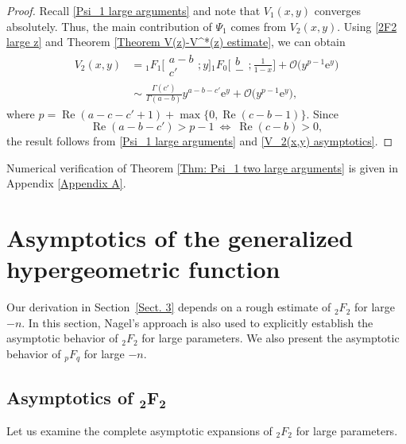\documentclass[pdftex]{sigma}
\numberwithin{equation}{section}
\newcommand{\me}{\mathrm{e}}
\newcommand{\mo}{\mathcal{O}}
\begin{document}
\begin{proof}
	Recall \eqref{Psi_1 large arguments} and note that $V_1(x,y)$ converges absolutely. Thus, the main contribution of $\Psi_1$ comes from $V_2(x,y)$. Using \eqref{2F2 large z} and Theorem \ref{Theorem V(z)-V^*(z) estimate}, we can obtain
	\begin{align}
		V_2(x,y)&{} ={}_1F_1\biggl[\begin{matrix}
			a-b\\
			c'
		\end{matrix};y\biggr]{}_1F_0\biggl[\begin{matrix}
			b\\
			-
		\end{matrix};\frac{1}{1-x}\biggr]+\mo\bigl(y^{p-1}\me^y\bigr)\nonumber\\
		&{} \sim \frac{\Gamma(c')}{\Gamma(a-b)}y^{a-b-c'}\me^y+\mo\bigl(y^{p-1}\me^y\bigr), \label{V_2(x,y) asymptotics}
	\end{align}
	where $p=\operatorname{Re}(a-c-c'+1)+\max\{0,\operatorname{Re}(c-b-1)\}$. Since
	\[\operatorname{Re}(a-b-c')>p-1 \ \Leftrightarrow \ \operatorname{Re}(c-b)>0,\]
	the result follows from \eqref{Psi_1 large arguments} and \eqref{V_2(x,y) asymptotics}.
\end{proof}

Numerical verification of Theorem \ref{Thm: Psi_1 two large arguments} is given in Appendix \ref{Appendix A}.


\section{Asymptotics of the generalized hypergeometric function}\label{Sect. 4}
Our derivation in Section~\ref{Sect. 3} depends on a rough estimate of $_2F_2$ for large $-n$. In this section, Nagel's approach is also used to explicitly establish the asymptotic behavior of $_2F_2$ for large parameters. We also present the asymptotic behavior of $_pF_q$ for large $-n$.

\subsection[Asymptotics of \_2F\_2]{Asymptotics of $\boldsymbol{_2F_2}$}
Let us examine the complete asymptotic expansions of $_2F_2$ for large parameters.
\end{document}
